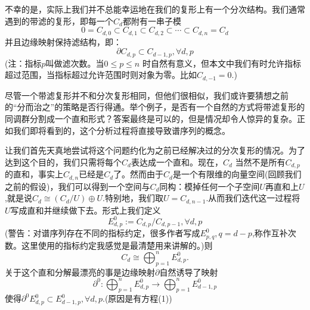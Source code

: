 \documentclass[a4paper,11pt,openany]{ctexart}
\begin{document}
不幸的是，实际上我们并不总能幸运地在我们的复形上有一个分次结构。我们通常遇到的带滤的复形，即每一个$C_d$都附有一串子模
\[0=C_{d,0}\subset C_{d,1}\subset C_{d,2}\subset \cdots \subset C_{d,n}=C_d\]
并且边缘映射保持滤结构，即：
\begin{equation}
  \partial C_{d,p}\subset C_{d-1,p},\forall d,p
\end{equation}
(注：指标$p$叫做滤次数。当$0\leq p \leq n$ 时自然有意义，但本文中我们有时允许指标超过范围，当指标超过允许范围时则对象为零。比如$C_{d,-1}=0.$)

尽管一个带滤复形并不和分次复形相同，但他们很相似，我们或许要猜想之前的“分而治之”的策略是否行得通。举个例子，是否有一个自然的方式将带滤复形的同调群分割成一个直和形式？答案最终是可以的，但是情况却令人惊异的复杂。正如我们即将看到的，这个分析过程将直接导致谱序列的概念。

让我们首先天真地尝试将这个问题约化为之前已经解决过的分次复形的情况。为了达到这个目的，我们只需将每个$C_d$表达成一个直和。现在，$C_d$ 当然不是所有$C_{d,p}$的直和，事实上$C_{d,n}$已经是$C_d$了。然而由于$C_d$是一个有限维的向量空间(回顾我们之前的假设)，我们可以得到一个空间与$C_d$同构：模掉任何一个子空间$U$再直和上$U$,就是说$C_d\cong (C_d/U)\oplus U.$特别地，我们取$U=C_{d,n-1}$.从而我们迭代这一过程将$U$写成直和并继续做下去。形式上我们定义
\begin{equation}
  E^0_{d,p}:=C_{d,p}/C_{d,p-1},\forall d,p
\end{equation}
(警告：对谱序列存在不同的指标约定，很多作者写成$E_{p,q}^0,q=d-p$,称作互补次数。这里使用的指标约定我感觉是最清楚用来讲解的。)则
\begin{equation}
  C_d\cong \bigoplus_{p=1}^n E_{d,p}^0.
\end{equation}
关于这个直和分解最漂亮的事是边缘映射$\partial$自然诱导了映射
\[\partial^0:\bigoplus_{p=1}^n E_{d,p}^0 \to \bigoplus_{p=1}^n E_{d-1,p}^0\]
使得$\partial^0 E_{d,p}^0\subset E^0_{d-1,p},\forall d,p$.(原因是有方程(1))
\end{document}
